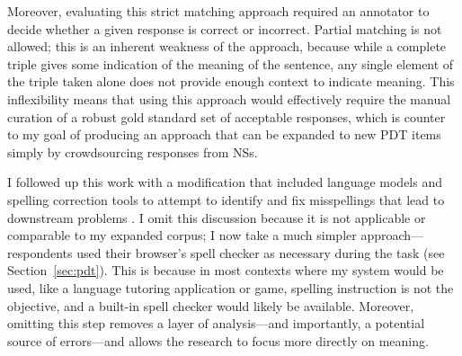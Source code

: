 Moreover, evaluating this strict matching approach required an annotator to decide whether a given response is correct or incorrect. Partial matching is not allowed; this is an inherent weakness of the approach, because while a complete triple gives some indication of the meaning of the sentence, any single element of the triple taken alone does not provide enough context to indicate meaning. This inflexibility means that using this approach would effectively require the manual curation of a robust gold standard set of acceptable responses, which is counter to my goal of producing an approach that can be expanded to new PDT items simply by crowdsourcing responses from NSs.


I followed up this work with a modification that included language models and spelling correction tools to attempt to identify and fix misspellings that lead to downstream problems \citep{king:dickinson:14}. I omit this discussion because it is not applicable or comparable to my expanded corpus; I now take a much simpler approach---respondents used their browser's spell checker as necessary during the task (see Section~\ref{sec:pdt}). This is because in most contexts where my system would be used, like a language tutoring application or game, spelling instruction is not the objective, and a built-in spell checker would likely be available. Moreover, omitting this step removes a layer of analysis---and importantly, a potential source of errors---and allows the research to focus more directly on meaning.

